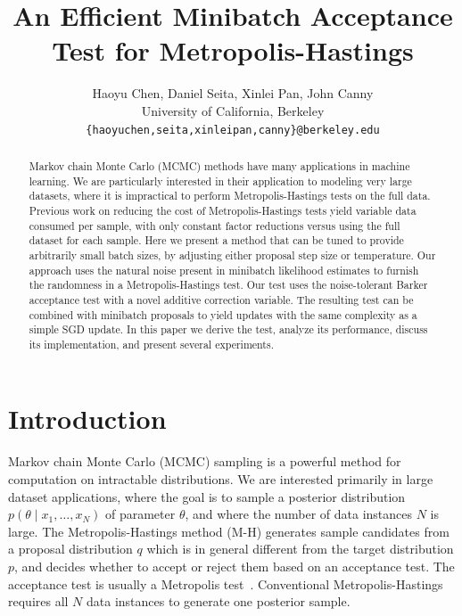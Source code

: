 \documentclass{article}
\title{An Efficient Minibatch Acceptance Test for Metropolis-Hastings}
\author{
  Haoyu Chen, Daniel Seita, Xinlei Pan, John Canny \\
  University of California, Berkeley \\
  \texttt{\{haoyuchen,seita,xinleipan,canny\}@berkeley.edu}
 }
\begin{document}
\maketitle

\begin{abstract}
Markov chain Monte Carlo (MCMC) methods have many applications in
machine learning. We are particularly interested in their application
to modeling very large datasets, where it is impractical to perform
Metropolis-Hastings tests on the full data. Previous work on reducing
the cost of Metropolis-Hastings tests yield variable data consumed per
sample, with only constant factor reductions versus using the full
dataset for each sample.  Here we present a method that can be tuned
to provide arbitrarily small batch sizes, by adjusting either proposal
step size or temperature. Our approach uses the natural noise present
in minibatch likelihood estimates to furnish the randomness in a
Metropolis-Hastings test. Our test uses the noise-tolerant Barker
acceptance test with a novel additive correction variable.  The
resulting test can be combined with minibatch proposals to yield
updates with the same complexity as a simple SGD update. In this paper
we derive the test, analyze its performance, discuss its
implementation, and present several experiments.
\end{abstract}



\section{Introduction}\label{sec:introduction}

Markov chain Monte Carlo (MCMC) sampling is a powerful method for
computation on intractable distributions. We are interested primarily
in large dataset applications, where the goal is to sample a posterior
distribution $p(\theta \mid x_1, \ldots, x_N)$ of parameter $\theta$,
and where the number of data instances $N$ is large.  The
Metropolis-Hastings method (M-H) generates sample candidates from a
proposal distribution $q$ which is in general different from the
target distribution $p$, and decides whether to accept or reject them
based on an acceptance test. The acceptance test is usually a
Metropolis test~\cite{Metropolis1953,hastings70}. Conventional
Metropolis-Hastings requires all $N$ data instances to generate one
posterior sample.
\end{document}
